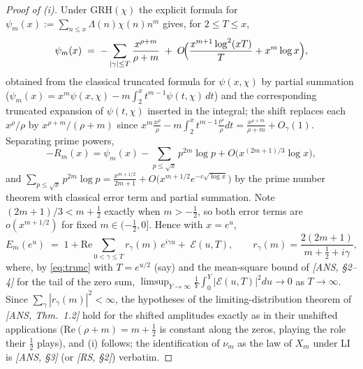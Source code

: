 \begin{proof}[Proof of (i)]
Under GRH$(\chi)$ the explicit formula for
$\psi_m(x):=\sum_{n\le x}\Lambda(n)\chi(n)n^m$ gives, for
$2\le T\le x$,
\begin{equation}\label{eq:trunc}
\psi_m(x)\;=\;-\sum_{|\gamma|\le T}\frac{x^{\rho+m}}{\rho+m}
\;+\;O\!\Bigl(\frac{x^{m+1}\log^2(xT)}{T}+x^{m}\log x\Bigr),
\end{equation}
obtained from the classical truncated formula for $\psi(x,\chi)$
by partial summation ($\psi_m(x)=x^m\psi(x,\chi)-m\int_2^x
t^{m-1}\psi(t,\chi)\,dt$) and the corresponding truncated expansion of
$\psi(t,\chi)$ inserted in the integral; the shift replaces each
$x^\rho/\rho$ by $x^{\rho+m}/(\rho+m)$ since
$x^m\frac{x^\rho}{\rho}-m\int_2^x t^{m-1}\frac{t^\rho}{\rho}dt
=\frac{x^{\rho+m}}{\rho+m}+O_\gamma(1)$.
Separating prime powers,
\[
-R_m(x)=\psi_m(x)-\sum_{p\le\sqrt x}p^{2m}\log p+O\!\bigl(x^{(2m+1)/3}\log x\bigr),
\]
and $\sum_{p\le\sqrt x}p^{2m}\log p=\frac{x^{m+1/2}}{2m+1}
+O\bigl(x^{m+1/2}e^{-c\sqrt{\log x}}\bigr)$ by the prime number theorem
with classical error term and partial summation. Note
$(2m+1)/3<m+\tfrac12$ exactly when $m>-\tfrac12$, so both error terms
are $o(x^{m+1/2})$ for fixed $m\in(-\tfrac12,0]$. Hence with $x=e^u$,
\[
E_m(e^u)\;=\;1+\mathrm{Re}\sum_{0<\gamma\le T} r_\gamma(m)\,e^{i\gamma u}
+\;\mathcal E(u,T),\qquad
r_\gamma(m)=\frac{2(2m+1)}{m+\tfrac12+i\gamma},
\]
where, by \eqref{eq:trunc} with $T=e^{u/2}$ (say) and the mean-square
bound of \emph{[ANS, \S2--4]} for the tail of the zero sum,
$\limsup_{Y\to\infty}\frac1Y\int_0^Y|\mathcal E(u,T)|^2du\to0$ as
$T\to\infty$. Since $\sum_\gamma|r_\gamma(m)|^2<\infty$, the hypotheses
of the limiting-distribution theorem of \emph{[ANS, Thm.~1.2]} hold for
the shifted amplitudes exactly as in their unshifted applications
($\mathrm{Re}(\rho+m)=m+\tfrac12$ is constant along the zeros, playing
the role their $\tfrac12$ plays), and (i) follows; the identification
of $\nu_m$ as the law of $X_m$ under LI is \emph{[ANS, \S3]} (or
\emph{[RS, \S2]}) verbatim.
\end{proof}

